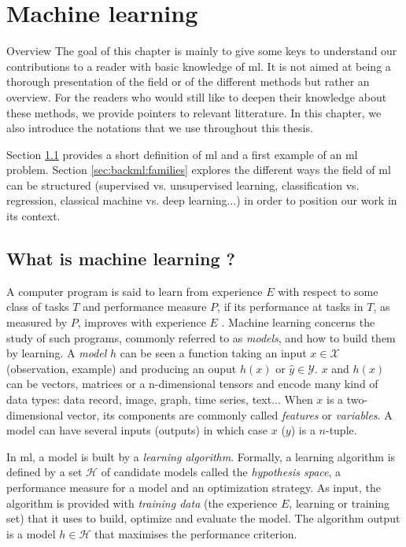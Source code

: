 \chapter{Machine learning}
\label{chap:backml}

\begin{overview}{Overview}
The goal of this chapter is mainly to give some keys to understand our contributions to a reader with basic knowledge of \acrlong{ml}. It is not aimed at being a thorough presentation of the field or of the different methods but rather an overview. For the readers who would still like to deepen their knowledge about these methods, we provide pointers to relevant litterature. In this chapter, we also introduce the notations that we use throughout this thesis. 

Section \ref{sec:backml:whatisml} provides a short definition of \acrlong{ml} and a first example of an \acrshort{ml} problem. Section \ref{sec:backml:families} explores the different ways the field of \acrlong{ml} can be structured (\eg supervised vs. unsupervised learning, classification vs. regression, classical machine vs. deep learning...) in order to position our work in its context.   
\end{overview}

\section{What is machine learning ?} 
\label{sec:backml:whatisml}

A computer program is said to learn from experience $E$ with respect to some class of tasks $T$ and performance measure $P$, if its performance at tasks in $T$, as measured by $P$, improves with experience $E$ \parencite{mitchell1997machine}. Machine learning concerns the study of such programs, commonly referred to as \textit{models}, and how to build them by learning. A \textit{model} $h$ can be seen a function taking an input $x \in \mathcal{X}$ (\aka observation, example) and producing an ouput $h(x)$ or $\hat{y} \in \mathcal{Y}$. $x$ and $h(x)$ can be vectors, matrices or a n-dimensional tensors and encode many kind of data types: data record, image, graph, time series, text... When $x$ is a two-dimensional vector, its components are commonly called \textit{features} or \textit{variables}. A model can have several inputs (\resp outputs) in which case $x$ (\resp $y$) is a $n$-tuple.

In \acrlong{ml}, a model is built by a \textit{learning algorithm}. Formally, a learning algorithm is defined by a set $\mathcal{H}$ of candidate models called the \textit{hypothesis space}, a performance measure for a model and an optimization strategy. As input, the algorithm is provided with \textit{training data} (the experience $E$, \aka learning or training set) that it uses to build, optimize and evaluate the model. The algorithm output is a model $h \in \mathcal{H}$ that maximises the performance criterion. 

